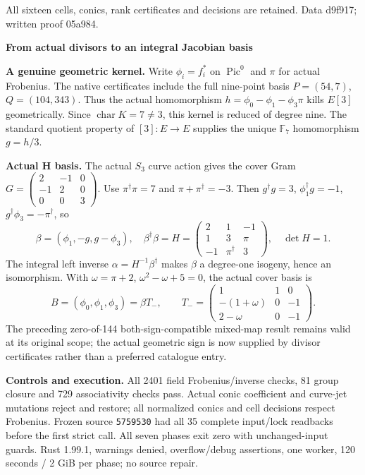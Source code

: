 \documentclass[10pt,a4paper]{article}
\begin{document}
All sixteen cells, conics, rank certificates and decisions are retained.
Data d9f917; written proof 05a984.\par
[pcc:unverified]
\newpage
{\Large\bfseries From actual divisors to an integral Jacobian basis}\par

\textbf{A genuine geometric kernel.} Write $\phi_i=f_i^*$ on
$\operatorname{Pic}^0$ and $\pi$ for actual Frobenius. The native
certificates include the full nine-point basis
$P=(54,7)$, $Q=(104,343)$. Thus the actual homomorphism
$h=\phi_0-\phi_1-\phi_3\pi$ kills $E[3]$ geometrically. Since
$\operatorname{char}K=7\ne3$, this kernel is reduced of degree nine.
The standard quotient property of $[3]:E\to E$ supplies the unique
$\mathbb F_7$ homomorphism $g=h/3$.

\textbf{Actual H basis.} The actual $S_3$ curve action gives the cover
Gram $G=\left(\begin{smallmatrix}2&-1&0\\-1&2&0\\0&0&3\end{smallmatrix}\right)$.
Use $\pi^\dagger\pi=7$ and $\pi+\pi^\dagger=-3$. Then
$g^\dagger g=3$, $\phi_1^\dagger g=-1$,
$g^\dagger\phi_3=-\pi^\dagger$, so
\[
 \beta=(\phi_1,-g,g-\phi_3),\quad
 \beta^\dagger\beta=H=
 \begin{pmatrix}2&1&-1\\1&3&\pi\\-1&\pi^\dagger&3\end{pmatrix},
 \quad \det H=1.
\]
The integral left inverse $\alpha=H^{-1}\beta^\dagger$ makes $\beta$
a degree-one isogeny, hence an isomorphism. With $\omega=\pi+2$,
$\omega^2-\omega+5=0$, the actual cover basis is
\[
 B=(\phi_0,\phi_1,\phi_3)=\beta T_-,\qquad
 T_-=\begin{pmatrix}1&1&0\\-(1+\omega)&0&-1\\2-\omega&0&-1\end{pmatrix}.
\]
The preceding zero-of-144 both-sign-compatible mixed-map result remains
valid at its original scope; the actual geometric sign is now supplied
by divisor certificates rather than a preferred catalogue entry.

\textbf{Controls and execution.} All 2401 field Frobenius/inverse checks,
81 group closure and 729 associativity checks pass. Actual conic
coefficient and curve-jet mutations reject and restore; all normalized
conics and cell decisions respect Frobenius. Frozen source
\texttt{5759530} had all 35 complete input/lock readbacks before the
first strict call. All seven phases exit zero with unchanged-input
guards. Rust 1.99.1, warnings denied, overflow/debug assertions,
one worker, 120 seconds / 2 GiB per phase; no source repair.
\end{document}
